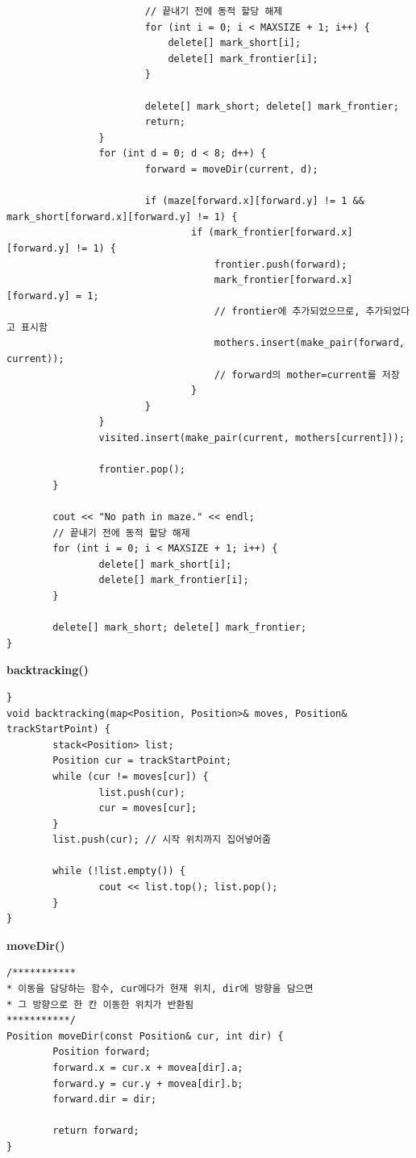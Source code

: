 \documentclass{article}
\begin{document}
\begin{verbatim}
            			// 끝내기 전에 동적 할당 해제
            			for (int i = 0; i < MAXSIZE + 1; i++) {
            				delete[] mark_short[i];
            				delete[] mark_frontier[i];
            			}
            
            			delete[] mark_short; delete[] mark_frontier;
            			return;
        		}
        		for (int d = 0; d < 8; d++) {
            			forward = moveDir(current, d);
            
            			if (maze[forward.x][forward.y] != 1 && mark_short[forward.x][forward.y] != 1) {
                				if (mark_frontier[forward.x][forward.y] != 1) {
                					frontier.push(forward);
                					mark_frontier[forward.x][forward.y] = 1; 
                					// frontier에 추가되었으므로, 추가되었다고 표시함
                					mothers.insert(make_pair(forward, current)); 
                					// forward의 mother=current를 저장
                				}
            			}
        		}
        		visited.insert(make_pair(current, mothers[current]));
        
        		frontier.pop();
    	}
    
    	cout << "No path in maze." << endl;
    	// 끝내기 전에 동적 할당 해제
    	for (int i = 0; i < MAXSIZE + 1; i++) {
        		delete[] mark_short[i];
        		delete[] mark_frontier[i];
    	}
    
    	delete[] mark_short; delete[] mark_frontier;
}
\end{verbatim}

\textbf{backtracking()}
\begin{verbatim}}
void backtracking(map<Position, Position>& moves, Position& trackStartPoint) {
    	stack<Position> list;
    	Position cur = trackStartPoint;
    	while (cur != moves[cur]) {
        		list.push(cur);
        		cur = moves[cur];
    	}
    	list.push(cur); // 시작 위치까지 집어넣어줌
    
    	while (!list.empty()) {
        		cout << list.top(); list.pop();
    	}
}
\end{verbatim}

\textbf{moveDir()}
\begin{verbatim}
/***********
* 이동을 담당하는 함수, cur에다가 현재 위치, dir에 방향을 담으면
* 그 방향으로 한 칸 이동한 위치가 반환됨
***********/
Position moveDir(const Position& cur, int dir) {
    	Position forward;
    	forward.x = cur.x + movea[dir].a;
    	forward.y = cur.y + movea[dir].b;
    	forward.dir = dir;
    
    	return forward;
}
\end{verbatim}
\end{document}
